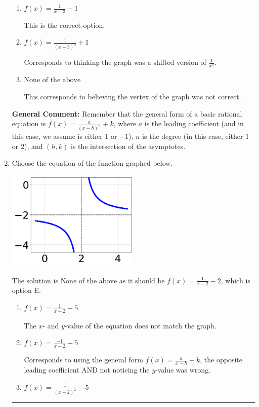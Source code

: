 \documentclass{extbook}[14pt]
\newcommand{\litem}[1]{\item #1

\rule{\textwidth}{0.4pt}}
\begin{document}
\begin{enumerate}
{\begin{enumerate}[label=\Alph*.]
Corresponds to thinking the graph was a shifted version of $\frac{1}{x^2}$, using the general form $f(x) = \frac{a}{x+h}+k$, and the opposite leading coefficient.
\item \( f(x) = \frac{1}{x - 3} + 1 \)

This is the correct option.
\item \( f(x) = \frac{1}{(x - 3)^2} + 1 \)

Corresponds to thinking the graph was a shifted version of $\frac{1}{x^2}$.
\item \( \text{None of the above} \)

This corresponds to believing the vertex of the graph was not correct.
\end{enumerate}

\textbf{General Comment:} Remember that the general form of a basic rational equation is $ f(x) = \frac{a}{(x-h)^n} + k$, where $a$ is the leading coefficient (and in this case, we assume is either $1$ or $-1$), $n$ is the degree (in this case, either $1$ or $2$), and $(h, k)$ is the intersection of the asymptotes.
}
\litem{
Choose the equation of the function graphed below.

\begin{center}
    \includegraphics[width=0.5\textwidth]{../Figures/rationalGraphToEquationCopyC.png}
\end{center}


The solution is \( \text{None of the above as it should be } f(x) = \frac{1}{x - 2} - 2 \), which is option E.\begin{enumerate}[label=\Alph*.]
\item \( f(x) = \frac{1}{x + 2} - 5 \)

The $x$- and $y$-value of the equation does not match the graph.
\item \( f(x) = \frac{-1}{x - 2} - 5 \)

Corresponds to using the general form $f(x) = \frac{a}{x-h}+k$, the opposite leading coefficient AND not noticing the $y$-value was wrong.
\item \( f(x) = \frac{1}{(x + 2)^2} - 5 \)


\end{enumerate}}
\end{enumerate}
\end{document}

